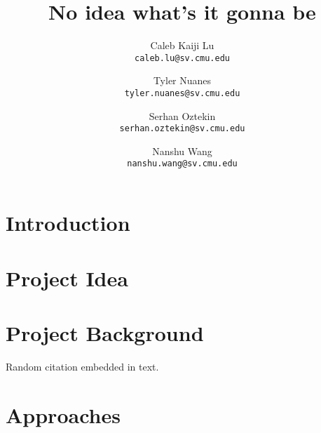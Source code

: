 \documentclass[11pt]{article}
\title{No idea what's it gonna be}
\author{
	Caleb Kaiji Lu \\
	{\tt caleb.lu@sv.cmu.edu}
	\and
	Tyler Nuanes \\
	{\tt tyler.nuanes@sv.cmu.edu}
	\and
	Serhan Oztekin \\
	{\tt serhan.oztekin@sv.cmu.edu}
	\and
	Nanshu Wang \\
	{\tt nanshu.wang@sv.cmu.edu}
}
\date{}
\begin{document}
\maketitle

\section{Introduction}
\section{Project Idea}
\section{Project Background}
Random citation \cite{DUMMY:1} embedded in text.
\section{Approaches}


\end{document}
